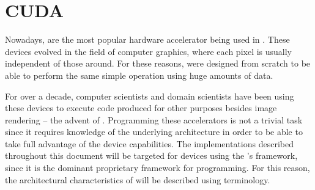 \documentclass[../thesis]{subfiles}
\begin{document}
	\chapter{CUDA}
	\label{chp:cuda}

	Nowadays, \gpus are the most popular hardware accelerator being used in \hpc. These devices evolved in the field of computer graphics, where each pixel is usually independent of those around. For these reasons, \gpus were designed from scratch to be able to perform the same simple operation using huge amounts of data.

	For over a decade, computer scientists and domain scientists have been using these devices to execute code produced for other purposes besides image rendering -- the advent of \gpgpus \cite{NVIDIA:GPGPU}. Programming these accelerators is not a trivial task since it requires knowledge of the underlying architecture in order to be able to take full advantage of the device capabilities. The \gpu implementations described throughout this document will be targeted for \nvidia devices using the \nvidia's \cuda framework, since it is the dominant proprietary framework for \gpgpu programming. For this reason, the architectural characteristics of \gpgpus will be described using \cuda terminology.

	
	
	
	
	
	
\end{document}
